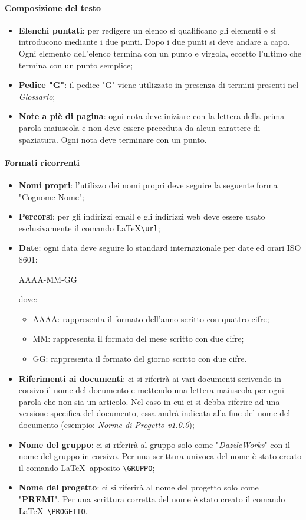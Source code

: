 \paragraph{Composizione del testo}
\begin{itemize}
	\item \textbf{Elenchi puntati}: per redigere un elenco si qualificano gli elementi e si introducono mediante
	i due punti. Dopo i due punti si deve andare a capo. Ogni elemento dell'elenco termina con un punto e virgola, eccetto l'ultimo che termina con un punto semplice;
	\item \textbf{Pedice "G"}: il pedice "G" viene utilizzato in presenza di termini presenti nel \textit{Glossario};
	\item \textbf{Note a piè di pagina}: ogni nota deve iniziare con la lettera della prima parola maiuscola e non deve essere preceduta da alcun carattere di spaziatura. Ogni nota deve terminare con un punto.
\end{itemize}

\paragraph{Formati ricorrenti}
\begin{itemize}
	\item \textbf{Nomi propri}: l'utilizzo dei nomi propri deve seguire la seguente forma "Cognome Nome";
	\item \textbf{Percorsi}: per gli indirizzi email e gli indirizzi web deve essere usato esclusivamente il comando \LaTeX  \verb|\url|;
	\item \textbf{Date}:  ogni data deve seguire lo standard internazionale per date ed orari ISO 8601:
	\begin{center}
		AAAA-MM-GG
	\end{center}
	dove:
	\begin{itemize}
		\item AAAA: rappresenta il formato dell'anno scritto con quattro cifre;
		\item MM: rappresenta il formato del mese scritto con due cifre;
		\item GG: rappresenta il formato del giorno scritto con due cifre.
	\end{itemize}
	\item \textbf{Riferimenti ai documenti}: ci si riferirà ai vari documenti scrivendo in corsivo il nome del documento e mettendo una lettera maiuscola per ogni parola che non sia un articolo. Nel caso in cui ci si debba riferire ad una versione specifica del documento, essa andrà indicata alla fine  del nome del documento (esempio: \textit{Norme di Progetto v1.0.0});
	\item \textbf{Nome del gruppo}: ci si riferirà al gruppo solo come "\textit{DazzleWorks}" con il nome del gruppo in corsivo. Per una scrittura univoca del nome è stato creato il comando \LaTeX\ apposito \verb|\GRUPPO|;
	\item \textbf{Nome del progetto}: ci si riferirà al nome del progetto solo come "\textbf{PREMI}". Per una scrittura corretta del nome è stato creato il comando \LaTeX\ \verb|\PROGETTO|.
\end{itemize}

